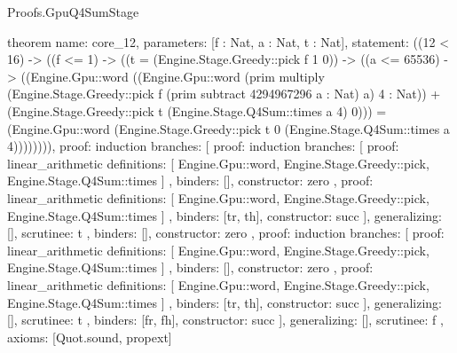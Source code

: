 \begin{lexlean}{Proofs.GpuQ4SumStage}
\begin{semanticmodule}
theorem{
  name: core_12,
  parameters: [f : Nat, a : Nat, t : Nat],
  statement: ((12 < 16) -> ((f <= 1) -> ((t = (Engine.Stage.Greedy::pick f 1 0)) -> ((a <= 65536) -> ((Engine.Gpu::word ((Engine.Gpu::word (prim multiply (Engine.Stage.Greedy::pick f (prim subtract 4294967296 a : Nat) a) 4 : Nat)) + (Engine.Stage.Greedy::pick t (Engine.Stage.Q4Sum::times a 4) 0))) = (Engine.Gpu::word (Engine.Stage.Greedy::pick t 0 (Engine.Stage.Q4Sum::times a 4)))))))),
  proof: induction{
    branches: [
      {
        proof: induction{
          branches: [
            {
              proof: linear_arithmetic{
                definitions: [
                  Engine.Gpu::word,
                  Engine.Stage.Greedy::pick,
                  Engine.Stage.Q4Sum::times
                ]
              },
              binders: [],
              constructor: zero
            },
            {
              proof: linear_arithmetic{
                definitions: [
                  Engine.Gpu::word,
                  Engine.Stage.Greedy::pick,
                  Engine.Stage.Q4Sum::times
                ]
              },
              binders: [tr, th],
              constructor: succ
            }
          ],
          generalizing: [],
          scrutinee: t
        },
        binders: [],
        constructor: zero
      },
      {
        proof: induction{
          branches: [
            {
              proof: linear_arithmetic{
                definitions: [
                  Engine.Gpu::word,
                  Engine.Stage.Greedy::pick,
                  Engine.Stage.Q4Sum::times
                ]
              },
              binders: [],
              constructor: zero
            },
            {
              proof: linear_arithmetic{
                definitions: [
                  Engine.Gpu::word,
                  Engine.Stage.Greedy::pick,
                  Engine.Stage.Q4Sum::times
                ]
              },
              binders: [tr, th],
              constructor: succ
            }
          ],
          generalizing: [],
          scrutinee: t
        },
        binders: [fr, fh],
        constructor: succ
      }
    ],
    generalizing: [],
    scrutinee: f
  },
  axioms: [Quot.sound, propext]
}


\end{semanticmodule}
\end{lexlean}
